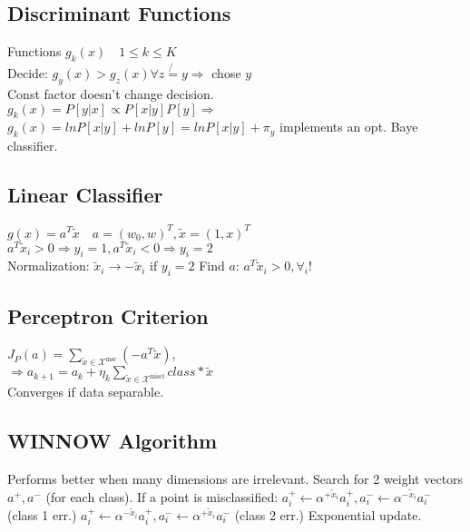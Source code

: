  \subsection*{Discriminant Functions}
 Functions $g_k(x)\quad1\leq k\leq K$\\
 Decide: $g_y(x){>}g_z(x)\forall z \not{=} y {\Rightarrow}$ chose $y$\\
 Const factor doesn't change decision.\\
 $g_k(x)=P[y|x]\propto P[x|y]P[y] \Rightarrow$\\
 $g_k(x){=}lnP[x|y]+lnP[y]{=}lnP[x|y]+\pi_y$
 implements an opt. Baye classifier.


\subsection*{Linear Classifier}
$g(x)=a^T\tilde{x}\quad a=(w_0,w)^T, \tilde{x}=(1,x)^T$\\
$a^T\tilde{x}_i>0 \Rightarrow y_i=1, a^T\tilde{x}_i<0 \Rightarrow y_i=2$\\
Normalization: $\tilde{x}_i\rightarrow-\tilde{x}_i$ if $y_i=2$
Find $a$: $a^T\tilde{x}_i>0,\forall_i$!
\subsection*{Perceptron Criterion}
$J_P(a)=\sum_{\tilde{x}\in\mathcal{X}^\text{msc}}(-a^T\tilde{x})$,\\
$\Rightarrow a_{k+1}=a_k+\eta_k \sum_{\tilde{x}\in\mathcal{X}^\text{miscl}} class* \tilde{x}$\\
Converges if data separable.\\
\subsection*{WINNOW Algorithm}
Performs better when many dimensions are irrelevant. Search for 2 weight vectors $a^+, a^-$ (for each class). If a point is misclassified:
$a_i^+ {\leftarrow} \alpha^{+\tilde{x}_i}a_i^+, a_i^- {\leftarrow} \alpha^{-\tilde{x}_i}a_i^-$ (class 1 err.)
$a_i^+ {\leftarrow} \alpha^{-\tilde{x}_i}a_i^+, a_i^- {\leftarrow} \alpha^{+\tilde{x}_i}a_i^-$ (class 2 err.)
Exponential update.

